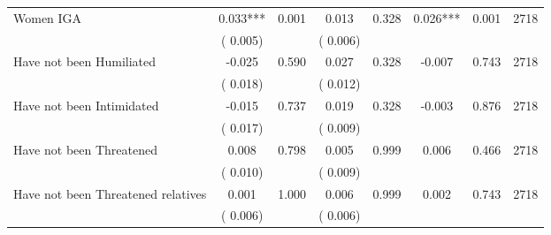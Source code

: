 \begin{tabular}{l*{7}{c}}
 Women IGA       &              0.033***       &        0.001  &              0.013       &        0.328  &              0.026***       &              0.001 &  2718 \\ 
                       &       (       0.005)             &                               &       (       0.006)                     &                               &                                               &                                &                      \\ 

 Have not been Humiliated       &             -0.025       &        0.590  &              0.027       &        0.328  &             -0.007       &              0.743 &  2718 \\ 
                       &       (       0.018)             &                               &       (       0.012)                     &                               &                                               &                                &                      \\ 

 Have not been Intimidated       &             -0.015       &        0.737  &              0.019       &        0.328  &             -0.003       &              0.876 &  2718 \\ 
                       &       (       0.017)             &                               &       (       0.009)                     &                               &                                               &                                &                      \\ 

 Have not been Threatened       &              0.008       &        0.798  &              0.005       &        0.999  &              0.006       &              0.466 &  2718 \\ 
                       &       (       0.010)             &                               &       (       0.009)                     &                               &                                               &                                &                      \\ 

 Have not been Threatened relatives       &              0.001       &        1.000  &              0.006       &        0.999  &              0.002       &              0.743 &  2718 \\ 
                       &       (       0.006)             &                               &       (       0.006)                     &                               &                                               &                                &                      \\ 


\end{tabular}
